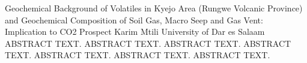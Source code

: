 \begin{conf-abstract}
{Geochemical Background of Volatiles in Kyejo Area (Rungwe Volcanic Province) and Geochemical Composition of Soil Gas, Macro Seep and Gas Vent: Implication to CO2 Prospect}
{Karim Mtili}
{University of Dar es Salaam}
{ABSTRACT TEXT. ABSTRACT TEXT. ABSTRACT TEXT. ABSTRACT TEXT. ABSTRACT TEXT. ABSTRACT TEXT. ABSTRACT TEXT.}
\end{conf-abstract}
